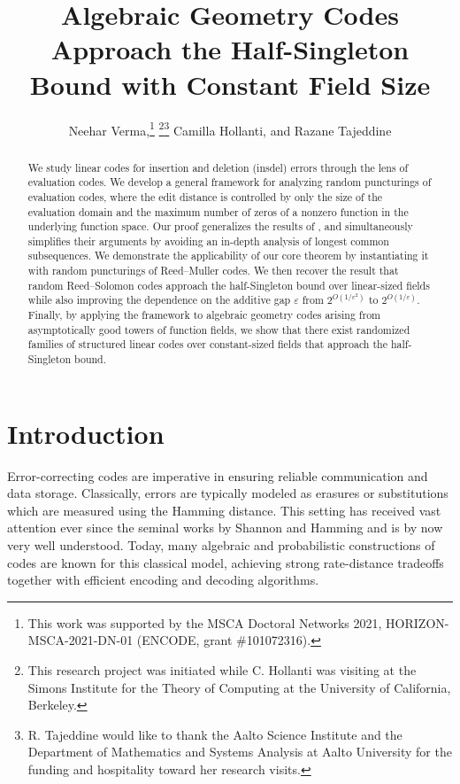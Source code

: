 \documentclass[draft, onecolumn, 11pt]{IEEEtran}
\begin{document}
\title{Algebraic Geometry Codes Approach the Half-Singleton Bound with Constant Field Size} 

\author{Neehar Verma,\thanks{This work was supported by the MSCA Doctoral Networks 2021, HORIZON-MSCA-2021-DN-01 (ENCODE, grant \#101072316).} 
\thanks{This research project was initiated while C. Hollanti was visiting at the Simons Institute for the Theory of Computing at the University of California, Berkeley. }\thanks{R. Tajeddine would like to thank the Aalto Science Institute and the Department of Mathematics and Systems Analysis at Aalto University for the funding and hospitality toward her research visits.}
Camilla Hollanti,  and 
Razane Tajeddine
}

\maketitle




\begin{abstract}
We study linear codes for insertion and deletion (insdel) errors through the lens of evaluation codes. We develop a general framework for analyzing random puncturings of evaluation codes, where the edit distance is controlled by only the size of the evaluation domain and the maximum number of zeros of a nonzero function in the underlying function space. Our proof generalizes the results of \cite{con2024randomRS}, and simultaneously simplifies their arguments by avoiding an in-depth analysis of longest common subsequences. We demonstrate the applicability of our core theorem by instantiating it with random puncturings of Reed--Muller codes. We then recover the result that random Reed--Solomon codes approach the half-Singleton bound over linear-sized fields while also improving the dependence on the additive gap $\varepsilon$ from $2^{O(1/\varepsilon^2)}$ to $2^{O(1/\varepsilon)}$. Finally, by applying the framework to algebraic geometry codes arising from asymptotically good towers of function fields, we show that there exist randomized families of structured linear codes over constant-sized fields that approach the half-Singleton bound. 
\end{abstract}

\section{Introduction}
Error-correcting codes are imperative in ensuring reliable communication and data storage. Classically, errors are typically modeled as erasures or substitutions which are measured using the Hamming distance. This setting has received vast attention ever since the seminal works by Shannon \cite{shannon1948mathematical} and Hamming \cite{hamming1950error} and is by now very well understood. Today, many algebraic and probabilistic constructions of codes are known for this classical model, achieving strong rate-distance tradeoffs together with efficient encoding and decoding algorithms. 
\end{document}
